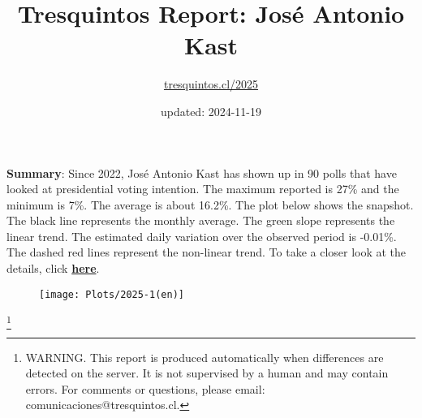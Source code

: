 \documentclass[
]{article}
\title{Tresquintos Report: José Antonio Kast}
\subtitle{\href{https://tresquintos.cl}{tresquintos.cl/2025}}
\author{}
\date{\vspace{-2.5em}updated: 2024-11-19}
\begin{document}
\maketitle

\addtolength{\headheight}{1.0cm} 
\pagestyle{fancy} 
\renewcommand{\headrulewidth}{0pt}

\textbf{Summary}: Since 2022, José Antonio Kast has shown up in 90 polls
that have looked at presidential voting intention. The maximum reported
is 27\% and the minimum is 7\%. The average is about 16.2\%. The plot
below shows the snapshot. The black line represents the monthly average.
The green slope represents the linear trend. The estimated daily
variation over the observed period is -0.01\%. The dashed red lines
represent the non-linear trend. To take a closer look at the details,
click \href{https://tresquintos.cl/2025}{\textbf{here}}.

\begin{figure}

{\centering \texttt{[image: Plots/2025-1(en)]} 

}

\end{figure}

\let\thefootnote\relax

\footnote{WARNING. This report is produced automatically when differences are detected on the server. It is not supervised by a human and may contain errors. For comments or questions, please email: comunicaciones@tresquintos.cl.}
\end{document}
